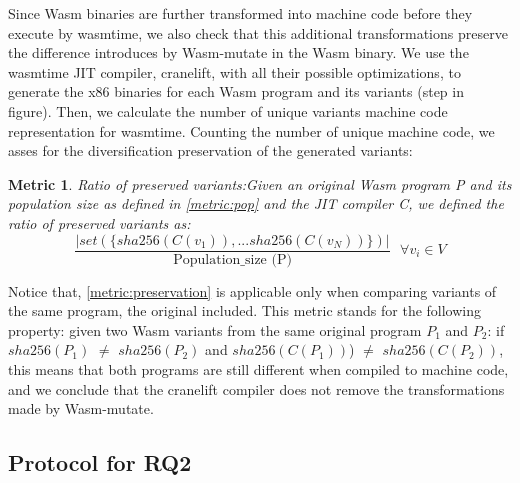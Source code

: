 \documentclass[sigplan,screen]{acmart}
\newcommand{\tool}{Wasm-mutate\xspace}
\newcommand{\wasm}{Wasm\xspace}
\newtheorem{metric}{Metric}
\newcommand*\step[1]{
\noindent\tikz[baseline=(char.base)]{
        \node[shape=circle,text=black,draw=black, fill=white,inner sep=1.2pt] (char) {#1};}}
\begin{document}
Since \wasm binaries are further transformed into machine code before they execute by wasmtime, we also check that this additional transformations preserve the difference introduces by \tool in the \wasm binary. 
We use the wasmtime JIT compiler, cranelift, with all their possible optimizations, to generate the x86 binaries for each \wasm program and its variants  (step \step{3} in figure). 
Then, we calculate the number of unique variants machine code representation for wasmtime.
Counting the number of unique machine code, we asses for the diversification preservation of the generated variants: \\

\begin{metric}{Ratio of preserved variants:}\label{metric:preservation}
    Given an original \wasm program P and its population size as defined in \autoref{metric:pop} and the JIT compiler C, we defined the ratio of preserved variants as:
    $$
        \frac{ | set(\{ sha256(C(v_1)), ... sha256(C(v_N)) \})|}{ \text{Population\_size (P)}} \text{ }\forall v_i \in V 
    $$

    
\end{metric}


Notice that, \autoref{metric:preservation} is applicable only when comparing variants of the same program, the original included. 
This metric stands for the following property: given two \wasm variants from the same original program $P_1$ and $P_2$:
if \\ $sha256(P_1)$ $\neq$ $sha256(P_2)$ and $sha256(C(P_1))$) $\neq$ $sha256(C(P_2))$, this means that  both programs are still different when compiled to machine code, and we conclude that the cranelift compiler does not remove the transformations made by \tool.  




\subsection{Protocol for RQ2}
\newcommand{\samples}{100\xspace}
\end{document}

